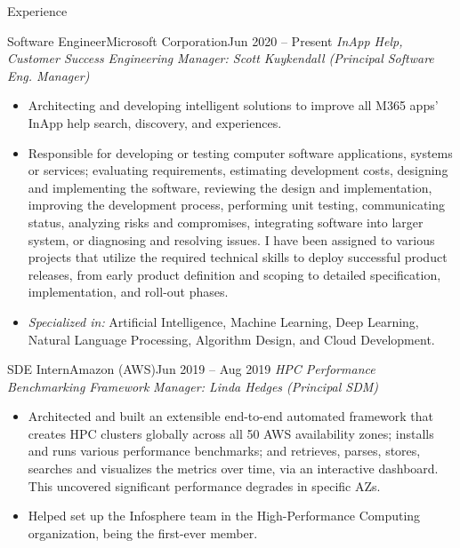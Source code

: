 \documentclass[]{mcdowellcv}
\begin{document}
	\makeheader
	

	\begin{cvsection}{Experience}
	        \begin{cvsubsection}{Software Engineer}{Microsoft Corporation}{Jun 2020 – Present}
			\textit{InApp Help, Customer Success Engineering} \hfill \textit{Manager:  Scott Kuykendall (Principal Software Eng. Manager)}
			\begin{itemize}
            \item Architecting and developing intelligent solutions to improve all M365 apps' InApp help search, discovery, and experiences.
            \item Responsible for developing or testing computer software applications, systems or services; evaluating requirements, estimating development costs, designing and implementing the software, reviewing the design and implementation, improving the development process, performing unit testing, communicating status, analyzing risks and compromises, integrating software into larger system, or diagnosing and resolving issues. I have been assigned to various projects that utilize the required technical skills to deploy successful product releases, from early product definition and scoping to detailed specification, implementation, and roll-out phases.
            \item \textit{Specialized in:} Artificial Intelligence, Machine Learning, Deep Learning, Natural Language Processing, Algorithm Design, and Cloud Development.
			\end{itemize}
		\end{cvsubsection}
	        \begin{cvsubsection}{SDE Intern}{Amazon (AWS)}{Jun 2019 – Aug 2019}
			\textit{HPC Performance Benchmarking Framework} \hfill \textit{Manager: Linda Hedges (Principal SDM)}
			\begin{itemize}
            \item Architected and built an extensible end-to-end automated framework that creates HPC clusters globally across all 50 AWS availability zones; installs and runs various performance benchmarks; and retrieves, parses, stores, searches and visualizes the metrics over time, via an interactive dashboard. This uncovered significant performance degrades in specific AZs. %
            \item Helped set up the Infosphere team in the High-Performance Computing organization, being the first-ever member.
			\end{itemize}
		\end{cvsubsection}


\end{cvsection}
\end{document}

